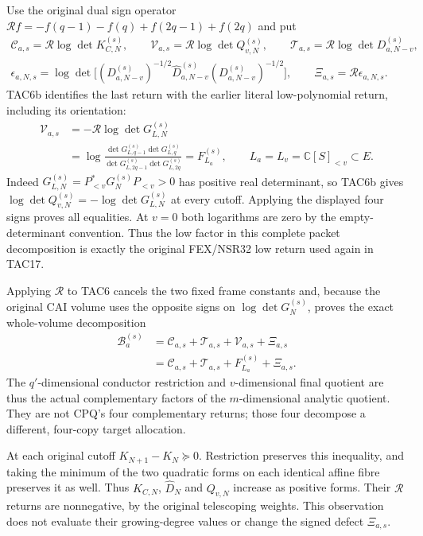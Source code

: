 \documentclass[11pt,a4paper]{article}
\begin{document}
Use the original dual sign operator
$\mathcal R f=-f(q-1)-f(q)+f(2q-1)+f(2q)$ and put
\[
 \begin{gathered}
 \mathcal C_{a,s}=\mathcal R\log\det K_{C,N}^{(s)},\qquad
 \mathcal V_{a,s}=\mathcal R\log\det Q_{v,N}^{(s)},\qquad
 \mathcal T_{a,s}=\mathcal R\log\det D_{a,N-v}^{(s)},\\
 \epsilon_{a,N,s}=\log\det\bigl[(D_{a,N-v}^{(s)})^{-1/2}
          \widehat D_{a,N-v}^{(s)}(D_{a,N-v}^{(s)})^{-1/2}\bigr],
 \qquad \Xi_{a,s}=\mathcal R\epsilon_{a,N,s}.
 \end{gathered}
 \tag{TAC9}
\]
TAC6b identifies the last return with the earlier literal low-polynomial
return, including its orientation:
\[
\begin{aligned}
 \mathcal V_{a,s}
  &=-\mathcal R\log\det G_{L,N}^{(s)}\\
  &=\log\frac{\det G_{L,q-1}^{(s)}\det G_{L,q}^{(s)}}
                 {\det G_{L,2q-1}^{(s)}\det G_{L,2q}^{(s)}}
    =F_{L_a}^{(s)},\qquad L_a=L_v=\mathbb C[S]_{<v}\subset E .
\end{aligned}\tag{TAC9a}
\]
Indeed $G_{L,N}^{(s)}=P_{<v}^*G_N^{(s)}P_{<v}>0$ has positive
real determinant, so TAC6b gives
$\log\det Q_{v,N}^{(s)}=-\log\det G_{L,N}^{(s)}$ at every cutoff.
Applying the displayed four signs proves all equalities. At $v=0$
both logarithms are zero by the empty-determinant convention. Thus the
low factor in this complete packet decomposition is exactly the
original FEX/NSR32 low return used again in TAC17.

Applying $\mathcal R$ to TAC6 cancels the two fixed frame constants
and, because the original CAI volume uses the opposite signs on
$\log\det G_N^{(s)}$, proves the exact whole-volume decomposition
\[
 \boxed{\begin{aligned}
 \mathcal B_a^{(s)}
   &=\mathcal C_{a,s}+\mathcal T_{a,s}+\mathcal V_{a,s}+\Xi_{a,s}\\
   &=\mathcal C_{a,s}+\mathcal T_{a,s}+F_{L_a}^{(s)}+\Xi_{a,s}.
\end{aligned}}
 \tag{TAC10}
\]
The $q'$-dimensional conductor restriction and $v$-dimensional final
quotient are thus the actual complementary factors of the $m$-dimensional
analytic quotient.  They are not CPQ's four complementary returns;
those four decompose a different, four-copy target allocation.

At each original cutoff $K_{N+1}-K_N\succeq0$.  Restriction preserves
this inequality, and taking the minimum of the two quadratic forms on
each identical affine fibre preserves it as well.  Thus $K_{C,N}$,
$\widehat D_N$ and $Q_{v,N}$ increase as positive forms.  Their
$\mathcal R$ returns are nonnegative, by the original telescoping
weights.  This observation does not evaluate their growing-degree
values or change the signed defect $\Xi_{a,s}$.
\end{document}
